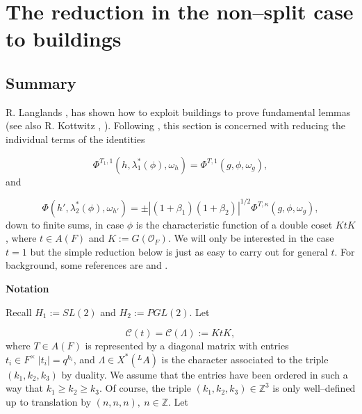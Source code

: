 \documentclass[12pt,letterpaper]{amsart}
\numberwithin{equation}{section}
\theoremstyle{definition}
\theoremstyle{plain}
\providecommand{\cal}{\mathcal}
\def\zzz{\mathbb{Z}}
\def\off{{\cal O}_F}
\begin{document}


\section{The reduction in the non--split case to buildings}
\label{sec:3}

\subsection{Summary}
\label{sec:3.1}

R. Langlands \cite{LaUn}, \cite{La80b} has shown how to exploit buildings
to prove fundamental lemmas (see also R. Kottwitz \cite{Ko80}, \cite{Ko81}). 
Following \cite{LaUn}, this section is concerned 
with  reducing the individual terms of the identities

\begin{equation}
\label{eqn:3.1}
\Phi^{T_1,1}(h,\lambda_1^*(\phi ),\omega_h) = 
\Phi^{T,1}(g,\phi ,\omega_g),
\end{equation}
and

\begin{equation}
\label{eqn:3.2}
\Phi(h',\lambda_2^*(\phi ),\omega_{h'}) = 
\pm |(1+\beta_1)(1+\beta_2)|^{1/2}\Phi^{T,\kappa}(g,\phi ,\omega_g),
\end{equation}
down to finite sums, in case $\phi$ is the characteristic function of a
double coset $KtK$, where $t\in A(F)$ and $K:=G(\off )$. 
We will only be interested in the case $t=1$ but the simple reduction
below is just as easy to carry out for general $t$.
For background, some references are \cite{La80b} and \cite{Ko80}.

{\bf Notation}

Recall $H_1:=SL(2)$ and $H_2:=PGL(2)$. Let

\[
\mathcal C(t) = \mathcal C(\Lambda ) := KtK,
\]
where $T\in A(F)$ is represented by a diagonal matrix with entries
$t_i \in F^{\times}\ |t_i|=q^{k_i}$, and $\Lambda\in X^*({^{L}}A)$
is the character associated to the triple $(k_1,k_2,k_3)$ by duality. 
We assume that the entries have been
ordered in such a way that $k_1\geq k_2\geq k_3$. Of course, the triple
$(k_1,k_2,k_3)\in \zzz^3$ is only well--defined up to translation by
$(n,n,n), \ n\in \zzz$. Let
\end{document}
